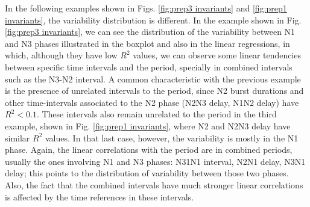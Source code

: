In the following examples shown in Figs. \ref{fig:prep3 invariants} and \ref{fig:prep1 invariants}, the variability distribution is different. In the example shown in Fig. \ref{fig:prep3 invariants}, we can see the distribution of the variability between N1 and N3 phases illustrated in the boxplot and also in the linear regressions, in which, although they have low $R^2$ values, we can observe some linear tendencies between specific time intervals and the period, specially in combined intervals such as the N3-N2 interval. A common characteristic with the previous example is the presence of unrelated intervals to the period, since N2 burst durations and other time-intervals associated to the N2 phase (N2N3 delay, N1N2 delay) have $R^2 < 0.1$. These intervals also remain unrelated to the period in the third example, shown in Fig. \ref{fig:prep1 invariants}, where N2 and N2N3 delay have similar $R^2$ values. In that last case, however, the variability is mostly in the N1 phase. Again, the linear correlations with the period are in combined periods, usually the ones involving N1 and N3 phases: N31N1 interval, N2N1 delay, N3N1 delay; this points to the distribution of variability between those two phases. Also, the fact that the combined intervals have much stronger linear correlations is affected by the time references in these intervals.




